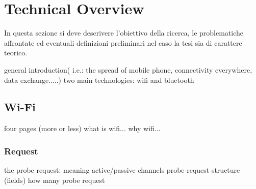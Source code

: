 \chapter{Technical Overview}
\label{chapter 3}
\thispagestyle{empty}


\noindent In questa sezione si deve descrivere l'obiettivo della ricerca, le problematiche affrontate ed eventuali definizioni preliminari nel caso la tesi sia di carattere teorico.

general introduction( i.e.: the spread of mobile phone, connectivity everywhere, data exchange.....)
two main technologies: wifi and bluetooth


\section{Wi-Fi}
four pages (more or less)
what is wifi...
why wifi...
\subsection{Request}
the probe request: meaning
active/passive
channels
probe request structure (fields)
how many probe request


